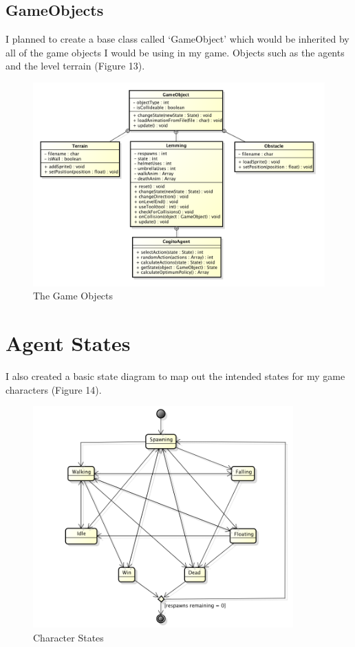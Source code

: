 \documentclass[a4paper,oneside]{report}
\begin{document}
\subsection{GameObjects}

I planned to create a base class called `GameObject' which would be inherited by all of the game objects I would be using in my game. Objects such as the agents and the level terrain (Figure 13).

\begin{figure}[h!]
  \centering
    \includegraphics[width=140mm]{sources/images/GameObjects}
    \caption{The Game Objects}
\end{figure}
	
\section{Agent States}

I also created a basic state diagram to map out the intended states for my game characters (Figure 14).

\begin{figure}[h!]
  \centering
    \includegraphics[width=100mm]{sources/images/LemmingStatemachine}
    \caption{Character States}
\end{figure}
	
\end{document}
